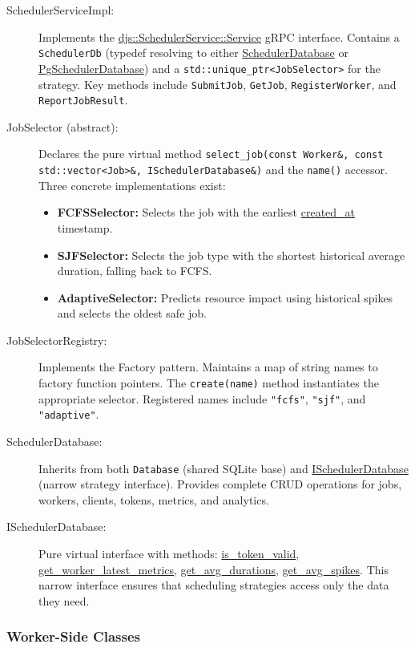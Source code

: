 \begin{description}
	\item[SchedulerServiceImpl:] Implements the \url{djs::SchedulerService::Service} gRPC interface. Contains a \texttt{SchedulerDb} (typedef resolving to either \url{SchedulerDatabase} or \url{PgSchedulerDatabase}) and a \texttt{std::unique\_ptr<JobSelector>} for the strategy. Key methods include \texttt{SubmitJob}, \texttt{GetJob}, \texttt{RegisterWorker}, and \texttt{ReportJobResult}.

	\item[JobSelector (abstract):] Declares the pure virtual method \texttt{select\_job(const Worker\&, const std::vector<Job>\&, ISchedulerDatabase\&)} and the \texttt{name()} accessor. Three concrete implementations exist:
		\begin{itemize}
			\item \textbf{FCFSSelector:} Selects the job with the earliest \url{created_at} timestamp.
			\item \textbf{SJFSelector:} Selects the job type with the shortest historical average duration, falling back to FCFS.
			\item \textbf{AdaptiveSelector:} Predicts resource impact using historical spikes and selects the oldest safe job.
		\end{itemize}

	\item[JobSelectorRegistry:] Implements the Factory pattern. Maintains a map of string names to factory function pointers. The \texttt{create(name)} method instantiates the appropriate selector. Registered names include \texttt{"fcfs"}, \texttt{"sjf"}, and \texttt{"adaptive"}.

	\item[SchedulerDatabase:] Inherits from both \texttt{Database} (shared SQLite base) and \url{ISchedulerDatabase} (narrow strategy interface). Provides complete CRUD operations for jobs, workers, clients, tokens, metrics, and analytics.

	\item[ISchedulerDatabase:] Pure virtual interface with methods: \url{is_token_valid}, \url{get_worker_latest_metrics}, \url{get_avg_durations}, \url{get_avg_spikes}. This narrow interface ensures that scheduling strategies access only the data they need.
\end{description}

\subsubsection{Worker-Side Classes}

